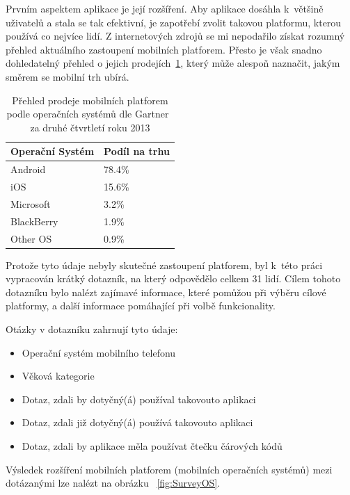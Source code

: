 \documentclass[thesis=B,czech]{FITthesis}[2013/10/20]
\begin{document}
Prvním aspektem aplikace je její rozšíření. Aby aplikace dosáhla k~většině uživatelů a stala se tak efektivní, je zapotřebí zvolit takovou platformu, kterou používá co nejvíce lidí. Z internetových zdrojů se mi nepodařilo získat rozumný přehled aktuálního zastoupení mobilních platforem. Přesto je však snadno dohledatelný přehled o jejich prodejích~\ref{table:MobilePlatf}, který může alespoň naznačit, jakým směrem se mobilní trh ubírá.

\begin{table}[H]
    \begin{tabular}{|l|l|}
    \hline
    Operační Systém & Podíl na trhu \\ \hline
    Android         & 78.4\%        \\ \hline
    iOS             & 15.6\%        \\ \hline
    Microsoft       & 3.2\%         \\ \hline
    BlackBerry      & 1.9\%         \\ \hline
    Other OS        & 0.9\%         \\ \hline
    \end{tabular}
    \caption{Přehled prodeje mobilních platforem podle operačních systémů dle Gartner~\cite{gartner} za druhé čtvrtletí roku 2013}
    \label{table:MobilePlatf}
\end{table}

Protože tyto údaje nebyly skutečné zastoupení platforem, byl k~této práci vypracován krátký dotazník, na který odpovědělo celkem 31 lidí. Cílem tohoto dotazníku bylo nalézt zajímavé informace, které pomůžou při výběru cílové platformy, a další informace pomáhající při volbě funkcionality.

Otázky v dotazníku zahrnují tyto údaje:
\begin{itemize}
	\item Operační systém mobilního telefonu
	\item Věková kategorie
	\item Dotaz, zdali by dotyčný(á) používal takovouto aplikaci
	\item Dotaz, zdali již dotyčný(á) používá takovouto aplikaci
	\item Dotaz, zdali by aplikace měla používat čtečku čárových kódů
\end{itemize}

Výsledek rozšíření mobilních platforem (mobilních operačních systémů) mezi dotázanými lze nalézt na obrázku ~\ref{fig:SurveyOS}.
\end{document}
